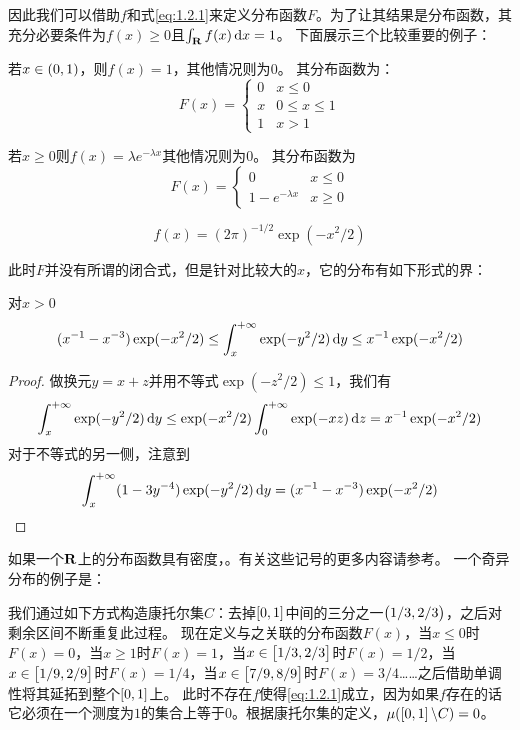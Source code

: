 \documentclass[main.tex]{subfiles}
\begin{document}
因此我们可以借助\(f\)和式\eqref{eq:1.2.1}来定义分布函数\(F\)。为了让其结果是分布函数，其充分必要条件为\(f(x) \geq 0\)且\(\int_\R f(x) \dif x = 1\)。
下面展示三个比较重要的例子：
\begin{example}
	若\(x \in \intoo{0,1}\)，则\(f(x) = 1\)，其他情况则为\(0\)。
	其分布函数为：
	\[F(x) = \begin{cases}
		0&x\leq 0\\
		x&0\leq x\leq 1\\
		1&x>1
	\end{cases}\]
\end{example}
\begin{example}
	若\(x \geq 0\)则\(f(x) = \lambda e^{-\lambda x}\)其他情况则为\(0\)。
	其分布函数为
	\[F(x) = \begin{cases}
		0&x\leq 0\\
		1-e^{-\lambda x}&x \geq 0
	\end{cases}\]
\end{example}
\begin{example}[标准正态分布]
	\[f(x) = (2\pi)^{-1/2}\exp(-x^2/2)\]
\end{example}
此时\(F\)并没有所谓的闭合式，但是针对比较大的\(x\)，它的分布有如下形式的界：
\begin{theorem} \label{thm:1.2.6}
	对\(x > 0\)
	\[(x^{-1} - x^{-3})\exp(-x^2/2) \leq \int_{x}^{+\infty} \exp(-y^2/2) \dif y \leq x^{-1}\exp(-x^2/2)\]
\end{theorem}
\begin{proof}
	做换元\(y=x+z\)并用不等式\(\exp(-z^2/2) \leq 1\)，我们有
	\[\int_{x}^{+\infty} \exp(-y^2/2) \dif y \leq \exp(-x^2/2)\int_{0}^{+\infty}\exp(-xz) \dif z = x^{-1}\exp(-x^2/2)\]
	对于不等式的另一侧，注意到
	\[\int_{x}^{+\infty} (1-3y^{-4})\exp(-y^2/2) \dif y = (x^{-1} - x^{-3})\exp(-x^2/2)\]
\end{proof}
如果一个\(\mathbf{R}\)上的分布函数具有密度，。有关这些记号的更多内容请参考。
一个奇异分布的例子是：
\begin{example}[康托尔集上的均匀分布]\label{ex:1.2.7}
我们通过如下方式构造康托尔集\(C\)：去掉\(\intcc{0,1}\)中间的三分之一\(\intoo{1/3,2/3}\)，之后对剩余区间不断重复此过程。
现在定义与之关联的分布函数\(F(x)\)，当\(x\leq0\)时\(F(x)=0\)，当\(x\geq1\)时\(F(x)=1\)，当\(x\in\intcc{1/3,2/3}\)时\(F(x)=1/2\)，当\(x\in\intcc{1/9,2/9}\)时\(F(x)=1/4\)，当\(x\in\intcc{7/9,8/9}\)时\(F(x)=3/4\)……之后借助单调性将其延拓到整个\(\intcc{0,1}\)上。
此时不存在\(f\)使得\eqref{eq:1.2.1}成立，因为如果\(f\)存在的话它必须在一个测度为\(1\)的集合上等于\(0\)。根据康托尔集的定义，\(\mu(\intcc{0,1}\backslash C)=0\)。
\end{example}
\end{document}
